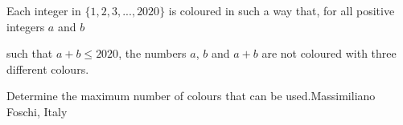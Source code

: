 Each integer in $\{1, 2, 3, . . . , 2020\}$ is coloured in such a way that, for all positive integers $a$ and $b$

such that $a + b \leq 2020$,  the numbers $a$,  $b$ and $a + b$ are not coloured with three different colours.

Determine the maximum number of colours that can be used.Massimiliano Foschi, Italy
